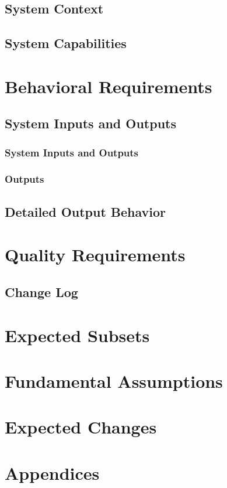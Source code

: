 \documentclass[a4paper, 11pt]{article}
\begin{document}
\subsection{System Context}
\subsection{System Capabilities}

\section{Behavioral Requirements}
\subsection{System Inputs and Outputs}
\subsubsection{System Inputs and Outputs}
\subsubsection{Outputs}
\subsection{Detailed Output Behavior}

\section{Quality Requirements}
\subsection{Change Log}
\section{Expected Subsets}

\section{Fundamental Assumptions}

\section{Expected Changes}

\section{Appendices}
\end{document}
